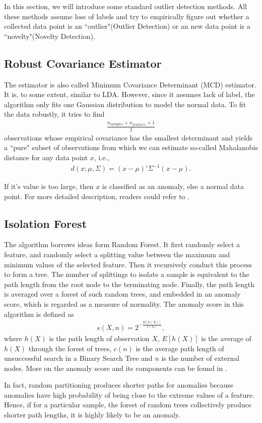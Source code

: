 \documentclass[english]{article}
\newenvironment{eqt}{\begin{equation}\begin{aligned}}{\end{aligned}\end{equation}}
\begin{document}
\par
In this section, we will introduce some standard outlier detection methods. All these methods assume loss of labels and try to empirically figure out whether a collected data point is an ``outlier"(Outlier Detection) or an new data point is a ``novelty"(Novelty Detection). 

\subsection{Robust Covariance Estimator}
\par
The estimator is also called Minimum Covariance Determinant (MCD) estimator. It is, to some extent, similar to LDA. However, since it assumes lack of label, the algorithm only fits one Gaussian distribution to model the normal data. To fit the data robustly, it tries to find 
\begin{eqt}
\frac{n_{\textit{samples}}+n_{\textit{features}}+1}{2}
\end{eqt}
observations whose empirical covariance has the smallest determinant and yields a ``pure" subset of observations from which we can estimate so-called Mahalanobis distance for any data point $x$, i.e., 
\begin{eqt}
d(x; \mu, \Sigma) = (x-\mu)'\Sigma^{-1}(x-\mu).
\end{eqt}
\par
If it's value is too large, then $x$ is classified as an anomaly, else a normal data point. For more detailed description, readers could refer to \cite{robustcov}.


\subsection{Isolation Forest}
\par
The algorithm borrows ideas form Random Forest. It first randomly select a feature, and randomly select a splitting value between the maximum and minimum values of the selected feature. Then it recursively conduct this process to form a tree. The number of splittings to isolate a sample is equivalent to the path length from the root node to the terminating node. Finally, the path length is averaged over a forest of such random trees, and embedded in an anomaly score, which is regarded as a measure of normality. The anomaly score in this algorithm is defined as 
\begin{eqt}
s(X, n) = 2^{-\frac{E[h(X)]}{c(n)}},
\end{eqt}
where $h(X)$ is the path length of observation $X$, $E[h(X)]$ is the average of $h(X)$ through the forest of trees, $c(n)$ is the average path length of unsuccessful search in a Binary Search Tree and $n$ is the number of external nodes. More on the anomaly score and its components can be found in \cite{isolationforest}.
\par
In fact, random partitioning produces shorter paths for anomalies because anomalies have high probability of being close to the extreme values of a feature. Hence, if for a particular sample, the forest of random trees collectively produce shorter path lengths, it is highly likely to be an anomaly.
\end{document}
